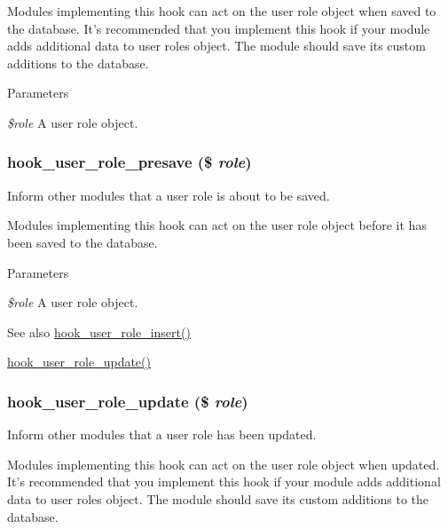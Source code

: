 Modules implementing this hook can act on the user role object when saved to the database. It's recommended that you implement this hook if your module adds additional data to user roles object. The module should save its custom additions to the database.


\begin{DoxyParams}{Parameters}
\item[{\em \$role}]A user role object. \end{DoxyParams}
\hypertarget{group__hooks_ga0b603e56348f9a8ab31505cc7e7acd36}{
\subsubsection[{hook\_\-user\_\-role\_\-presave}]{\setlength{\rightskip}{0pt plus 5cm}hook\_\-user\_\-role\_\-presave (\$ {\em role})}}
\label{group__hooks_ga0b603e56348f9a8ab31505cc7e7acd36}
Inform other modules that a user role is about to be saved.

Modules implementing this hook can act on the user role object before it has been saved to the database.


\begin{DoxyParams}{Parameters}
\item[{\em \$role}]A user role object.\end{DoxyParams}
\begin{DoxySeeAlso}{See also}
\hyperlink{group__hooks_ga79141c13b24e953eac78d810b530e96e}{hook\_\-user\_\-role\_\-insert()} 

\hyperlink{group__hooks_ga4c71374906f72f8a80b0c954202f86da}{hook\_\-user\_\-role\_\-update()} 
\end{DoxySeeAlso}
\hypertarget{group__hooks_ga4c71374906f72f8a80b0c954202f86da}{
\subsubsection[{hook\_\-user\_\-role\_\-update}]{\setlength{\rightskip}{0pt plus 5cm}hook\_\-user\_\-role\_\-update (\$ {\em role})}}
\label{group__hooks_ga4c71374906f72f8a80b0c954202f86da}
Inform other modules that a user role has been updated.

Modules implementing this hook can act on the user role object when updated. It's recommended that you implement this hook if your module adds additional data to user roles object. The module should save its custom additions to the database.


